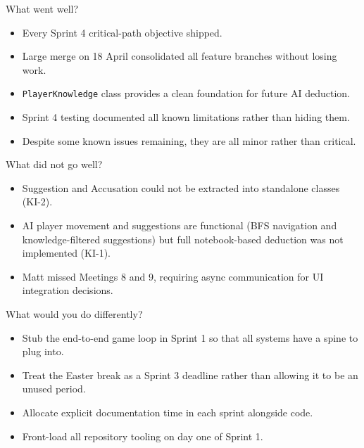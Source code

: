 What went well?
\begin{itemize}
    \item Every Sprint 4 critical-path objective shipped.
    \item Large merge on 18 April consolidated all feature branches without losing work.
    \item \texttt{PlayerKnowledge} class provides a clean foundation for future AI deduction.
    \item Sprint 4 testing documented all known limitations rather than hiding them.
    \item Despite some known issues remaining, they are all minor rather than critical.
\end{itemize}

What did not go well?
\begin{itemize}
    \item Suggestion and Accusation could not be extracted into standalone classes (KI-2).
    \item AI player movement and suggestions are functional (BFS navigation and knowledge-filtered suggestions) but full notebook-based deduction was not implemented (KI-1).
    \item Matt missed Meetings 8 and 9, requiring async communication for UI integration decisions.
\end{itemize}

What would you do differently?
\begin{itemize}
    \item Stub the end-to-end game loop in Sprint 1 so that all systems have a spine to plug into.
    \item Treat the Easter break as a Sprint 3 deadline rather than allowing it to be an unused period.
    \item Allocate explicit documentation time in each sprint alongside code.
    \item Front-load all repository tooling on day one of Sprint 1.
\end{itemize}

\newpage
